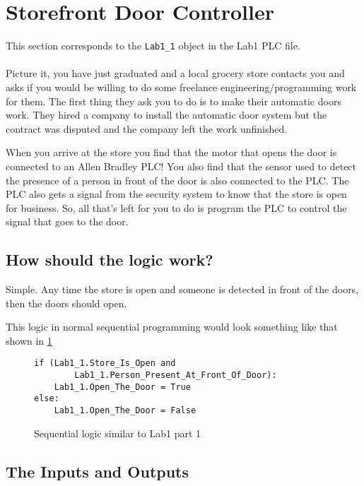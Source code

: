 \section{Storefront Door Controller}

This section corresponds to the \verb|Lab1_1| object in the Lab1 PLC file.
\\ 
\\
Picture it, you have just graduated and a local grocery store contacts you and asks if you would be willing to do some freelance engineering/programming work for them. The first thing they ask you to do is to make their automatic doors work. They hired a company to install the automatic door system but the contract was disputed and the company left the work unfinished.

When you arrive at the store you find that the motor that opens the door is connected to an Allen Bradley PLC! You also find that the sensor used to detect the presence of a person in front of the door is also connected to the PLC. The PLC also gets a signal from the security system to know that the store is open for business. So, all that's left for you to do is program the PLC to control the signal that goes to the door.

\subsection{How should the logic work?}

Simple. Any time the store is open and someone is detected in front of the doors, then the doors should open.

This logic in normal sequential programming would look something like that shown in \figureautorefname \ref{fig:2_1Sequential}

\lstset{style=mystyle}
\lstset{language=python}
\begin{figure}[h]
\begin{lstlisting}[firstnumber=1]
if (Lab1_1.Store_Is_Open and
        Lab1_1.Person_Present_At_Front_Of_Door):
    Lab1_1.Open_The_Door = True
else:
    Lab1_1.Open_The_Door = False
\end{lstlisting}
\caption{Sequential logic similar to Lab1 part 1}
\label{fig:2_1Sequential}
\end{figure}

\subsection{The Inputs and Outputs}

